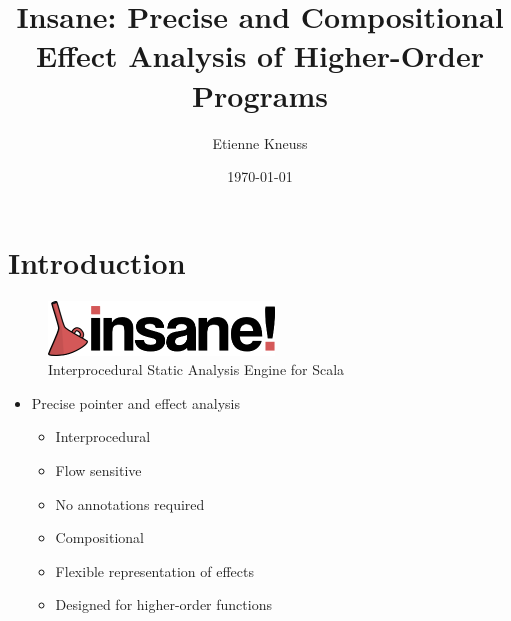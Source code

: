 \documentclass[hyperref={pdfpagelabels=false}]{beamer}
\begin{document}
\title{Insane: Precise and Compositional Effect Analysis of Higher-Order Programs}
\author{Etienne Kneuss}
\date{\today}

\nocite{*}


\begin{frame}
    \titlepage
\end{frame}


\section{Introduction}

\begin{frame}[label=overview]
    \begin{figure}[t]
        \includegraphics[width=60mm]{../../../logo.png}\\
        Interprocedural Static Analysis Engine for Scala
    \end{figure}

    \begin{itemize}
        \item Precise pointer and effect analysis
            \begin{itemize}
                \item Interprocedural
                \item Flow sensitive
                \item No annotations required
                \item Compositional
                \item Flexible representation of effects
                \item Designed for higher-order functions
            \end{itemize}
    \end{itemize}
\end{frame}
\end{document}
